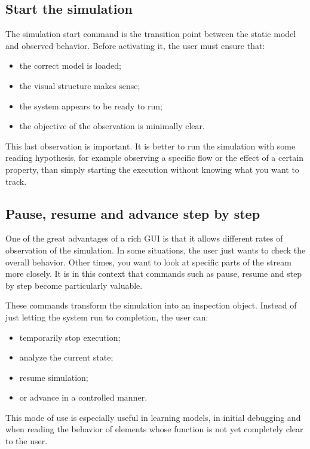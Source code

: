 \subsection{Start the simulation}
\label{subsec:cap5_iniciar_simulacao}

The simulation start command is the transition point between the static model and observed behavior. Before activating it, the user must ensure that:
\begin{itemize}
\item the correct model is loaded;
\item the visual structure makes sense;
\item the system appears to be ready to run;
\item the objective of the observation is minimally clear.
\end{itemize}

This last observation is important. It is better to run the simulation with some reading hypothesis, for example observing a specific flow or the effect of a certain property, than simply starting the execution without knowing what you want to track.

\subsection{Pause, resume and advance step by step}
\label{subsec:cap5_pausar_retormar_passo_a_passo}

One of the great advantages of a rich GUI is that it allows different rates of observation of the simulation. In some situations, the user just wants to check the overall behavior. Other times, you want to look at specific parts of the stream more closely. It is in this context that commands such as pause, resume and step by step become particularly valuable.

These commands transform the simulation into an inspection object. Instead of just letting the system run to completion, the user can:
\begin{itemize}
\item temporarily stop execution;
\item analyze the current state;
\item resume simulation;
\item or advance in a controlled manner.
\end{itemize}

This mode of use is especially useful in learning models, in initial debugging and when reading the behavior of elements whose function is not yet completely clear to the user.

